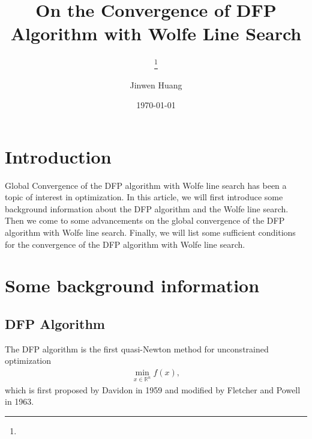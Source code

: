 \documentclass[12pt,a4paper,draft]{beamer}  %
\title{ }
\date{\DTMnow}
\author{
    \thanks{}
}
\newcounter{cite}
\theoremstyle{definition}
\numberwithin{equation}{section}
\newcommand{\RR}{\mathbb{R}}
\begin{document}
\title{On the Convergence of DFP Algorithm with Wolfe Line Search}
\author{Jinwen Huang}
\date{\today}

\maketitle








\tableofcontents

\section{Introduction}
Global Convergence of the DFP algorithm with Wolfe line search has been a topic of interest in optimization. 
In this article, we will first introduce some background information about the DFP algorithm and the Wolfe line search. 
Then we come to some advancements on the global convergence of the DFP algorithm with Wolfe line search.
Finally, we will list some sufficient conditions for the convergence of the DFP algorithm with Wolfe line search. 



\section{Some background information}

\subsection{DFP Algorithm}
The DFP algorithm is the first quasi-Newton method for unconstrained optimization
\begin{align}
\min_{x \in \RR^n} f(x),
\end{align}
which is first proposed by Davidon\cite{Da} in 1959 and modified by Fletcher and Powell\cite{FP} in 1963.
\end{document}
